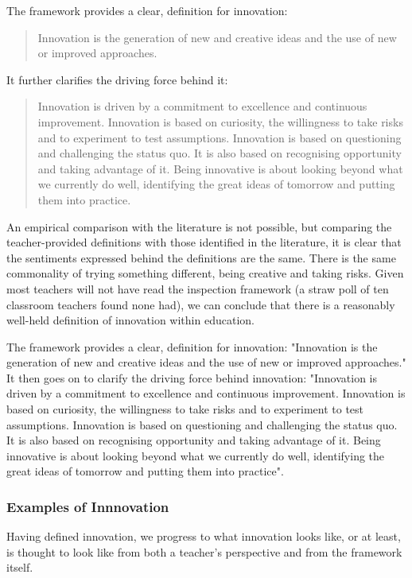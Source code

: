 The framework provides a clear, definition for innovation: \begin{quote}
Innovation is the generation of new and creative ideas and the use of new or improved approaches. 
\end{quote} \cite[p. 12]{ADEC2016}

It further clarifies the driving force behind it: 
\begin{quote}
Innovation is driven by a commitment to excellence and continuous improvement. Innovation is based on curiosity, the willingness to take risks and to experiment to test assumptions. Innovation is based on questioning and challenging the status quo. It is also based on recognising opportunity and taking advantage of it. Being innovative is about looking beyond what we currently do well, identifying the great ideas of tomorrow and putting them into practice.
\end{quote}

An empirical comparison with the literature is not possible, but comparing the teacher-provided definitions with those identified in the literature, it is clear that the sentiments expressed behind the definitions are the same. There is the same commonality of trying something different, being creative and taking risks. Given most teachers will not have read the inspection framework (a straw poll of ten classroom teachers found none had), we can conclude that there is a reasonably well-held definition of innovation within education.

The framework provides a clear, definition for innovation: "Innovation is the generation of new and creative ideas and the use of new or improved approaches." \cite[p. 12]{ADEC2016} It then goes on to clarify the driving force behind innovation: "Innovation is driven by a commitment to excellence and continuous improvement. Innovation is based on curiosity, the willingness to take risks and to experiment to test assumptions. Innovation is based on questioning and challenging the status quo. It is also based on recognising opportunity and taking advantage of it. Being innovative is about looking beyond what we currently do well, identifying the great ideas of tomorrow and putting them into practice".

\subsubsection{Examples of Innnovation}

Having defined innovation, we progress to what innovation looks like, or at least, is thought to look like from both a teacher’s perspective and from the framework itself.

